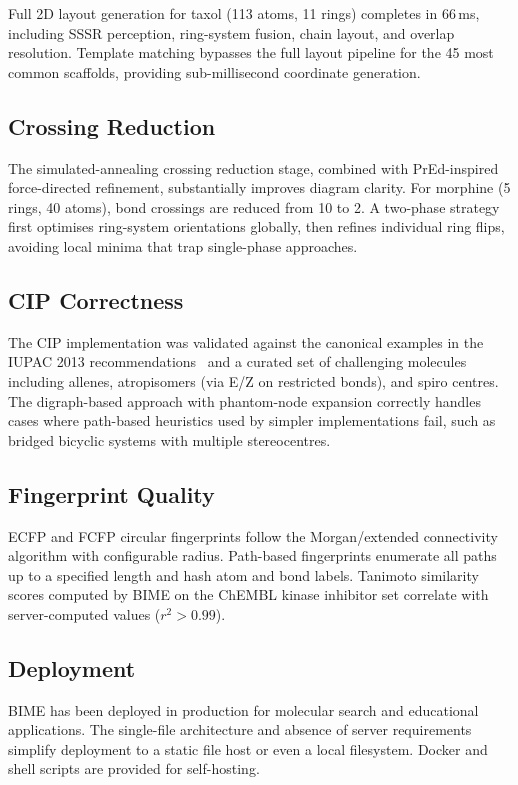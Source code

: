\documentclass[twocolumn]{article}
\begin{document}
Full 2D layout generation for taxol (113 atoms, 11 rings) completes in
66\,ms, including SSSR perception, ring-system fusion, chain layout,
and overlap resolution.  Template matching bypasses the full layout
pipeline for the 45 most common scaffolds, providing sub-millisecond
coordinate generation.

\subsection{Crossing Reduction}

The simulated-annealing crossing reduction stage, combined with
PrEd-inspired force-directed refinement, substantially improves diagram
clarity.  For morphine (5 rings, 40 atoms), bond crossings are reduced
from 10 to 2.  A two-phase strategy first optimises ring-system
orientations globally, then refines individual ring flips, avoiding
local minima that trap single-phase approaches.

\subsection{CIP Correctness}

The CIP implementation was validated against the canonical examples in
the IUPAC 2013 recommendations~\citep{Favre2013} and a curated set of
challenging molecules including allenes, atropisomers (via E/Z on
restricted bonds), and spiro centres.  The digraph-based approach with
phantom-node expansion correctly handles cases where path-based
heuristics used by simpler implementations fail, such as bridged
bicyclic systems with multiple stereocentres.

\subsection{Fingerprint Quality}

ECFP and FCFP circular fingerprints follow the Morgan/extended
connectivity algorithm with configurable radius.  Path-based
fingerprints enumerate all paths up to a specified length and hash atom
and bond labels.  Tanimoto similarity scores computed by BIME on the
ChEMBL kinase inhibitor set correlate with server-computed values
(\mbox{$r^2 > 0.99$}).

\subsection{Deployment}

BIME has been deployed in production for molecular search and
educational applications.  The single-file architecture and absence of
server requirements simplify deployment to a static file host or even a
local filesystem.  Docker and shell scripts are provided for
self-hosting.
\end{document}
